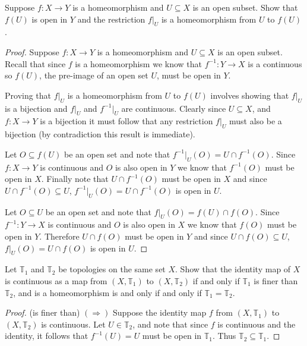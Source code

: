 \documentclass[minion]{homework651}
\begin{document}
\begin{problems}

\problem {} Suppose $f: X \to Y$ is a homeomorphism and $U \subseteq X$ is an open subset.
Show that $f(U)$ is open in $Y$ and the restriction $f|_U$ is a homeomorphism from $U$ to $f(U)$. 
\begin{proof}
    Suppose $f: X \to Y$ is a homeomorphism and $U \subseteq X$ is an open subset. Recall that since $f$ is 
    a homeomorphism we know that $f^{-1}: Y \to X$ is a continuous so $f(U)$, the pre-image of an open set $U$, must be open in $Y$.

    Proving that $f|_U$ is a homeomorphism from $U$ to $f(U)$ involves showing that  $f|_U$ is a bijection and  $f|_U$ and  $f^{-1}|_U$ are continuous.
    Clearly since $U \subseteq X$, and $f: X \to Y$ is a bijection it must follow that any restriction $f|_U$ must also be a bijection (by contradiction this result is immediate). 

    Let $O \subseteq f(U)$ be an open set and note that $f^{-1}|_U(O) = U \cap f^{-1}(O)$. Since $f: X \to Y$ is continuous and $O$ is also open in $Y$ we know that $f^{-1}(O)$ must be open in $X$. Finally note that
    $U \cap f^{-1}(O)$ must be open in $X$ and since $U \cap f^{-1}(O) \subseteq U$, $f^{-1}|_U(O) = U \cap f^{-1}(O)$ is open in $U$. 

    Let $O \subseteq U$ be an open set and note that $f|_U(O) = f(U) \cap f(O)$. Since $f^{-1}: Y \to X$ is continuous and $O$ is also open in $X$ we know that $f(O)$ must be open in $Y$. 
    Therefore $U \cap f(O)$ must be open in $Y$ and since $U \cap f(O) \subseteq U$, $f|_U(O) = U \cap f(O)$ is open in $U$. 
    
\end{proof}



\problem {} Let $\mathbb{T}_1$ and $\mathbb{T}_2$ be topologies on the same set $X$. Show 
that the identity map of $X$ is continuous as a map from $(X,\mathbb{T}_1)$ to $(X,\mathbb{T}_2)$ if and only if 
$\mathbb{T}_1$ is finer than $\mathbb{T}_2$, and is a homeomorphism is and only if and only if $\mathbb{T}_1 = \mathbb{T}_2$.


\begin{proof} (is finer than)
    $(\Rightarrow)$ Suppose the identity map $f$ from $(X,\mathbb{T}_1)$ to $(X,\mathbb{T}_2)$ is continuous. Let $U \in \mathbb{T}_2$, and note that since 
    $f$ is continuous and the identity, it follows that $f^{-1}(U) = U$ must be open in $\mathbb{T}_1$. Thus $\mathbb{T}_2 \subseteq \mathbb{T}_1$.



\end{proof}
\end{problems}
\end{document}
